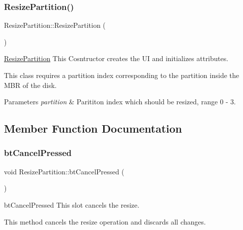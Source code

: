 \subsubsection{\texorpdfstring{Resize\+Partition()}{ResizePartition()}}
{\footnotesize\ttfamily Resize\+Partition\+::\+Resize\+Partition (\begin{DoxyParamCaption}{ }\end{DoxyParamCaption})}



\mbox{\hyperlink{class_resize_partition}{Resize\+Partition}} This Cosntructor creates the UI and initializes attributes. 

This class requires a partition index corresponding to the partition inside the M\+BR of the disk. 
\begin{DoxyParams}{Parameters}
{\em partition} & Parititon index which should be resized, range 0 -\/ 3. \\
\hline
\end{DoxyParams}


\subsection{Member Function Documentation}
\mbox{\label{class_resize_partition_a82f2b0a7f31c72e0ea6176415ddb855c}} 
\subsubsection{\texorpdfstring{bt\+Cancel\+Pressed}{btCancelPressed}}
{\footnotesize\ttfamily void Resize\+Partition\+::bt\+Cancel\+Pressed (\begin{DoxyParamCaption}{ }\end{DoxyParamCaption})\hspace{0.3cm}{\ttfamily [slot]}}



bt\+Cancel\+Pressed This slot cancels the resize. 

This method cancels the resize operation and discards all changes. \mbox{\label{class_resize_partition_ab742e4bcdf7e0684ad3e8a787309ef5d}} 
